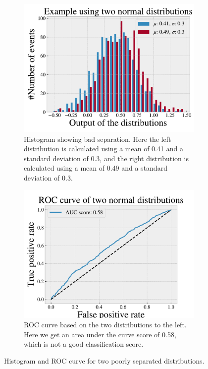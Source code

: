 \begin{figure}[H]
    \centering
    \begin{subfigure}{.45\textwidth}
        \includegraphics[width=\textwidth]{Figures/Machinelearning/histo_example_bad.pdf}
        \caption{Histogram showing bad separation. Here the left distribution is calculated using a mean of 0.41 and a standard 
        deviation of 0.3, and the right distribution is calculated using a mean of 0.49 and a standard deviation of 0.3.}
        \label{fig:dist_ex_bad}
    \end{subfigure}
    \hfill
    \begin{subfigure}{.45\textwidth}
        \includegraphics[width=\textwidth]{Figures/Machinelearning/ROC_curve_example_bad.pdf}
        \caption{ROC curve based on the two distributions to the left. Here we get an area under the curve score of 0.58, which is not a good classification score.}
        \label{fig:ROC_curve_ex_bad}
    \end{subfigure}
    \hfill        
    \caption{Histogram and ROC curve for two poorly separated distributions.}
    \label{fig:roc_example_bad}
\end{figure}

